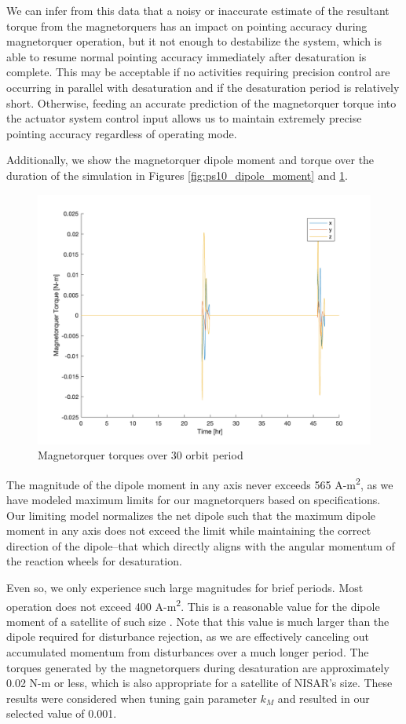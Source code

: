 We can infer from this data that a noisy or inaccurate estimate of the resultant torque from the magnetorquers has an impact on pointing accuracy during magnetorquer operation, but it not enough to destabilize the system, which is able to resume normal pointing accuracy immediately after desaturation is complete. This may be acceptable if no activities requiring precision control are occurring in parallel with desaturation and if the desaturation period is relatively short. Otherwise, feeding an accurate prediction of the magnetorquer torque into the actuator system control input allows us to maintain extremely precise pointing accuracy regardless of operating mode.

Additionally, we show the magnetorquer dipole moment and torque over the duration of the simulation in Figures \ref{fig:ps10_dipole_moment} and \ref{fig:ps10_mag_torque}.

\begin{figure}[H]
\centering
\includegraphics[scale=0.3]{Images/ps10_mag_torque.png}
\caption{Magnetorquer torques over 30 orbit period}
\label{fig:ps10_mag_torque}
\end{figure}

The magnitude of the dipole moment in any axis never exceeds 565 A-m\textsuperscript{2}, as we have modeled maximum limits for our magnetorquers based on specifications. Our limiting model normalizes the net dipole such that the maximum dipole moment in any axis does not exceed the limit while maintaining the correct direction of the dipole–that which directly aligns with the angular momentum of the reaction wheels for desaturation.

Even so, we only experience such large magnitudes for brief periods. Most operation does not exceed 400 A-m\textsuperscript{2}. This is a reasonable value for the dipole moment of a satellite of such size \cite{gibson1971low}. Note that this value is much larger than the dipole required for disturbance rejection, as we are effectively canceling out accumulated momentum from disturbances over a much longer period. The torques generated by the magnetorquers during desaturation are approximately 0.02 N-m or less, which is also appropriate for a satellite of NISAR's size. These results were considered when tuning gain parameter $k_{M}$ and resulted in our selected value of 0.001.